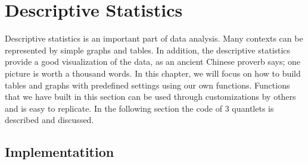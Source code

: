 \section{Descriptive Statistics}\label{Sec:Des_Stat}

Descriptive statistics is an important part of data analysis. Many contexts can be represented by simple graphs and tables. In addition, the descriptive statistics provide a good visualization of the data, as an ancient Chinese proverb says; one picture is worth a thousand words. In this chapter, we will focus on how to build tables and graphs with predefined settings using our own functions. Functions that we have built in this section can be used through customizations by others and is easy to replicate. In the following section the code of 3 quantlets is described and discussed.

\subsection{Implementatition}

